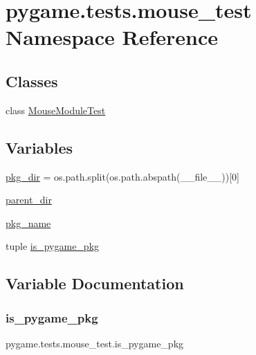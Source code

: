 \hypertarget{namespacepygame_1_1tests_1_1mouse__test}{}\section{pygame.\+tests.\+mouse\+\_\+test Namespace Reference}
\label{namespacepygame_1_1tests_1_1mouse__test}
\subsection*{Classes}
\begin{DoxyCompactItemize}
\item 
class \hyperlink{classpygame_1_1tests_1_1mouse__test_1_1_mouse_module_test}{Mouse\+Module\+Test}
\end{DoxyCompactItemize}
\subsection*{Variables}
\begin{DoxyCompactItemize}
\item 
\hyperlink{namespacepygame_1_1tests_1_1mouse__test_a982e223d03fb01a5909a6bc54297a4c2}{pkg\+\_\+dir} = os.\+path.\+split(os.\+path.\+abspath(\+\_\+\+\_\+file\+\_\+\+\_\+))\mbox{[}0\mbox{]}
\item 
\hyperlink{namespacepygame_1_1tests_1_1mouse__test_a71d7386d07e3cab00517bd34bd182fb2}{parent\+\_\+dir}
\item 
\hyperlink{namespacepygame_1_1tests_1_1mouse__test_a4c37d3e1dc075e783d648a9cf6952ab8}{pkg\+\_\+name}
\item 
tuple \hyperlink{namespacepygame_1_1tests_1_1mouse__test_aad4692d7eae7d7cba3dec64bb784e40a}{is\+\_\+pygame\+\_\+pkg}
\end{DoxyCompactItemize}


\subsection{Variable Documentation}
\mbox{\label{namespacepygame_1_1tests_1_1mouse__test_aad4692d7eae7d7cba3dec64bb784e40a}} 
\subsubsection{\texorpdfstring{is\+\_\+pygame\+\_\+pkg}{is\_pygame\_pkg}}
{\footnotesize\ttfamily pygame.\+tests.\+mouse\+\_\+test.\+is\+\_\+pygame\+\_\+pkg}

